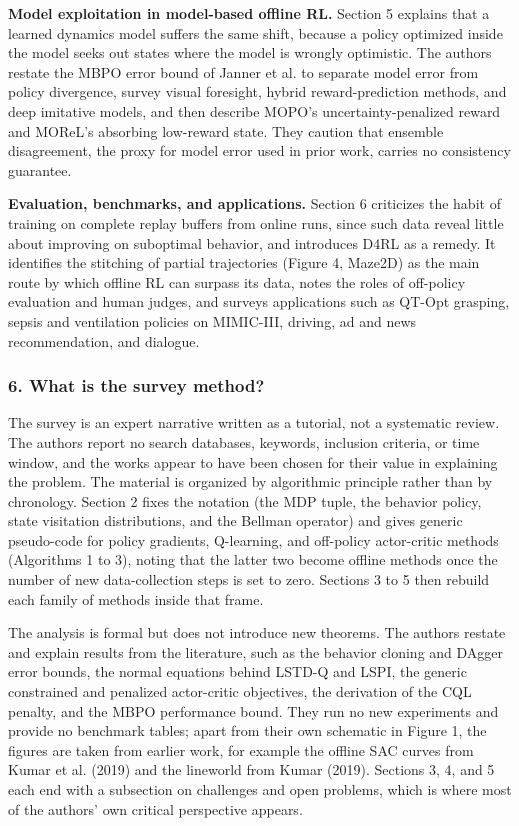 \documentclass[11pt]{article}
\newcommand{\question}[1]{\subsubsection*{#1}}
\begin{document}
\textbf{Model exploitation in model-based offline RL.} Section 5 explains that a learned dynamics model suffers the same shift, because a policy optimized inside the model seeks out states where the model is wrongly optimistic. The authors restate the MBPO error bound of Janner et al. to separate model error from policy divergence, survey visual foresight, hybrid reward-prediction methods, and deep imitative models, and then describe MOPO's uncertainty-penalized reward and MOReL's absorbing low-reward state. They caution that ensemble disagreement, the proxy for model error used in prior work, carries no consistency guarantee.

\textbf{Evaluation, benchmarks, and applications.} Section 6 criticizes the habit of training on complete replay buffers from online runs, since such data reveal little about improving on suboptimal behavior, and introduces D4RL as a remedy. It identifies the stitching of partial trajectories (Figure 4, Maze2D) as the main route by which offline RL can surpass its data, notes the roles of off-policy evaluation and human judges, and surveys applications such as QT-Opt grasping, sepsis and ventilation policies on MIMIC-III, driving, ad and news recommendation, and dialogue.

\question{6. What is the survey method?}

The survey is an expert narrative written as a tutorial, not a systematic review. The authors report no search databases, keywords, inclusion criteria, or time window, and the works appear to have been chosen for their value in explaining the problem. The material is organized by algorithmic principle rather than by chronology. Section 2 fixes the notation (the MDP tuple, the behavior policy, state visitation distributions, and the Bellman operator) and gives generic pseudo-code for policy gradients, Q-learning, and off-policy actor-critic methods (Algorithms 1 to 3), noting that the latter two become offline methods once the number of new data-collection steps is set to zero. Sections 3 to 5 then rebuild each family of methods inside that frame.

The analysis is formal but does not introduce new theorems. The authors restate and explain results from the literature, such as the behavior cloning and DAgger error bounds, the normal equations behind LSTD-Q and LSPI, the generic constrained and penalized actor-critic objectives, the derivation of the CQL penalty, and the MBPO performance bound. They run no new experiments and provide no benchmark tables; apart from their own schematic in Figure 1, the figures are taken from earlier work, for example the offline SAC curves from Kumar et al. (2019) and the lineworld from Kumar (2019). Sections 3, 4, and 5 each end with a subsection on challenges and open problems, which is where most of the authors' own critical perspective appears.
\end{document}
